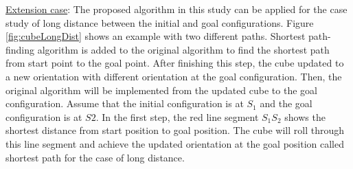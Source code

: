 

\noindent \uline{Extension case}: The proposed algorithm in this study can be applied for the case study of long distance between the initial and goal configurations. 
Figure \ref{fig:cubeLongDist} shows an example with two different paths.
Shortest path-finding algorithm is added to the original algorithm to find the shortest path from start point to the goal point. 
After finishing this step, the cube updated to a new orientation with different orientation at the goal configuration. Then, the original algorithm will be implemented from the updated cube to the goal configuration.
Assume that the initial configuration is at $S_1$ and the goal configuration is at $S2$. In the first step, the red line segment $S_1S_2$ shows the shortest distance from start position to goal position. The cube will roll through this line segment and achieve the updated orientation at the goal position called shortest path for the case of long distance. 

